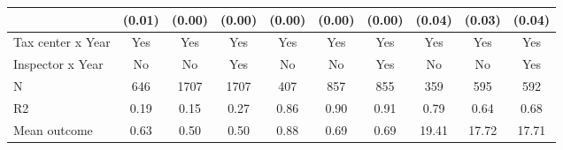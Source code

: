 \begin{tabular}{lccc|ccc|ccc}
            &      (0.01)         &      (0.00)         &      (0.00)         &      (0.00)         &      (0.00)         &      (0.00)         &      (0.04)         &      (0.03)         &      (0.04)         \\
\midrule
Tax center x Year&         Yes         &         Yes         &         Yes         &         Yes         &         Yes         &         Yes         &         Yes         &         Yes         &         Yes         \\
Inspector x Year&          No         &          No         &         Yes         &          No         &          No         &         Yes         &          No         &          No         &         Yes         \\
N           &         646         &        1707         &        1707         &         407         &         857         &         855         &         359         &         595         &         592         \\
R2          &        0.19         &        0.15         &        0.27         &        0.86         &        0.90         &        0.91         &        0.79         &        0.64         &        0.68         \\
Mean outcome&        0.63         &        0.50         &        0.50         &        0.88         &        0.69         &        0.69         &       19.41         &       17.72         &       17.71         \\
\bottomrule \end{tabular}
